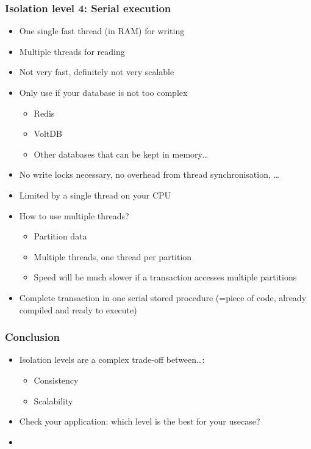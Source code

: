 \documentclass{article}
\begin{document}
\subsubsection{Isolation level 4: Serial execution }

\begin{itemize}
    \item One single fast thread (in RAM) for writing
    \item Multiple threads for reading
    \item Not very fast, definitely not very scalable
    \item Only use if your database is not too complex
    \begin{itemize}
        \item Redis
        \item VoltDB
        \item Other databases that can be kept in memory\dots
    \end{itemize}
    \item No write locks necessary, no overhead from thread synchronisation, \dots
    \item Limited by a single thread on your CPU
    \item How to use multiple threads?
    \begin{itemize}
        \item Partition data
        \item Multiple threads, one thread per partition
        \item Speed will be much slower if a transaction accesses multiple partitions
    \end{itemize}
    \item Complete transaction in one serial stored procedure (=piece of code, already compiled and ready to execute)
\end{itemize}

\subsubsection{Conclusion}

\begin{itemize}
    \item Isolation levels are a complex trade-off between\dots:
    \begin{itemize}
        \item Consistency
        \item Scalability
    \end{itemize}
    \item Check your application: which level is the best for your usecase?
    \item 
\end{itemize}
\end{document}
